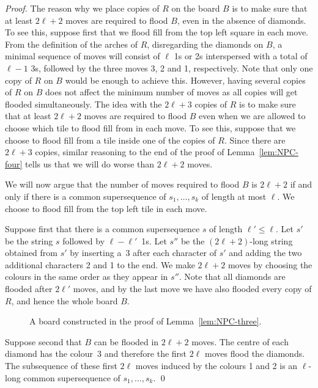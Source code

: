 \documentclass[a4paper,11pt]{llncs}
\newcommand{\pgfgraphic}[1]{}
\newcounter{l}
\renewcommand{\leq}{\leqslant}
\begin{document}
\begin{proof}
    The reason why we place copies of $R$ on the board $B$ is to make sure that at least $2\ell+2$ moves are required to flood $B$, even in the absence of diamonds. To see this, suppose first that we flood fill from the top left square in each move. From the definition of the arches of $R$, disregarding the diamonds on $B$, a minimal sequence of moves will consist of $\ell$ 1s or 2s interspersed with a total of $\ell-1$ 3s, followed by the three moves 3, 2 and 1, respectively. Note that only one copy of $R$ on $B$ would be enough to achieve this. However, having several copies of $R$ on $B$ does not affect the minimum number of moves as all copies will get flooded simultaneously. The idea with the $2\ell+3$ copies of $R$ is to make sure that at least $2\ell+2$ moves are required to flood $B$ even when we are allowed to choose which tile to flood fill from in each move. To see this, suppose that we choose to flood fill from a tile inside one of the copies of $R$. Since there are $2\ell+3$ copies, similar reasoning to the end of the proof of Lemma~\ref{lem:NPC-four} tells us that we will do worse than $2\ell+2$ moves.



    We will now argue that the number of moves required to flood $B$ is $2\ell+2$ if and only if there is a common supersequence of $s_1,\dots,s_k$ of length at most $\ell$. We choose to flood fill from the top left tile in each move.

    Suppose first that there is a common supersequence $s$ of length $\ell'\leq \ell$. Let $s'$ be the string $s$ followed by $\ell-\ell'$~1s. Let $s''$ be the $(2\ell+2)$-long string obtained from $s'$ by inserting a~3 after each character of $s'$ and adding the two additional characters 2 and 1 to the end. We make $2\ell+2$ moves by choosing the colours in the same order as they appear in $s''$. Note that all diamonds are flooded after $2\ell'$ moves, and by the last move we have also flooded every copy of $R$, and hence the whole board $B$.

\begin{figure}[t]
\centering
	\pgfgraphic{graphic-npc2}
\caption{A board constructed in the proof of Lemma~\ref{lem:NPC-three}.}
\label{fig:NPC2}
\end{figure}

    Suppose second that $B$ can be flooded in $2\ell+2$ moves. The centre of each diamond has the colour~3 and therefore the first $2\ell$ moves flood the diamonds. The subsequence of these first $2\ell$ moves induced by the colours 1 and 2 is an $\ell$-long common supersequence of $s_1,\dots,s_k$.
    \qed
\end{proof}
\end{document}
